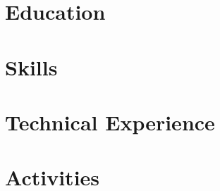 \documentclass[letter,10pt]{article}
\begin{document}
%
\section{Education}


\section{Skills}


\section{Technical Experience}



\section{Activities}

\end{document}
